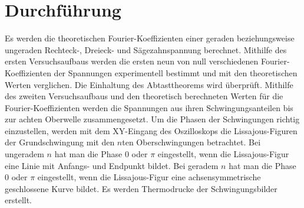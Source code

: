
\section{Durchführung}
\label{sec:Durchführung}

Es werden die theoretischen Fourier-Koeffizienten einer geraden beziehungsweise ungeraden Rechteck-, Dreieck- und Sägezahnspannung berechnet.
Mithilfe des ersten Versuchsaufbaus werden die ersten neun von null verschiedenen Fourier-Koeffizienten der Spannungen experimentell bestimmt und mit den theoretischen Werten verglichen.
Die Einhaltung des Abtasttheorems wird überprüft.\newline
Mithilfe des zweiten Versuchsaufbaus und den theoretisch berechneten Werten für die Fourier-Koeffizienten werden die Spannungen aus ihren Schwingungsanteilen bis zur achten Oberwelle zusammengesetzt. Um die Phasen der Schwingungen richtig einzustellen, werden mit dem XY-Eingang des Oszilloskops die Lissajous-Figuren der Grundschwingung mit den $n$ten Oberschwingungen betrachtet. Bei ungeradem $n$ hat man die Phase $0$ oder $\pi$ eingestellt, wenn die Lissajous-Figur eine Linie mit Anfangs- und Endpunkt bildet. Bei geradem $n$ hat man die Phase $0$ oder $\pi$ eingestellt, wenn die Lissajous-Figur eine achsensymmetrische geschlossene Kurve bildet.
Es werden Thermodrucke der Schwingungsbilder erstellt. 